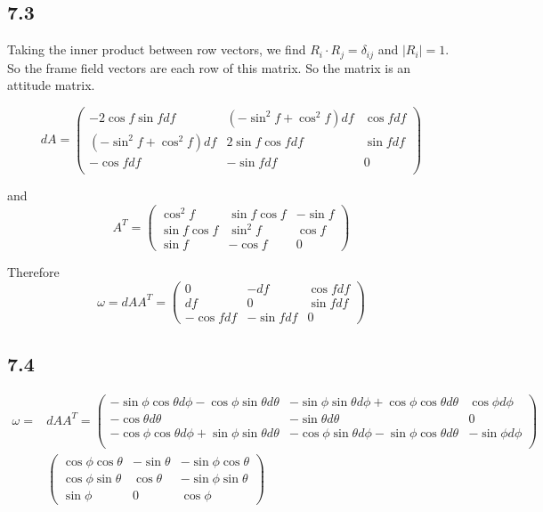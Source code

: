 \documentclass[12pt]{article}
\begin{document}
\subsection*{7.3}
Taking the inner product between row vectors, we find $R_i \cdot R_j = \delta_{ij}$ and $|R_i| = 1$. So the frame field vectors are each row of this matrix. So the matrix is an attitude matrix. 

$$ dA = \begin{pmatrix}
	-2\cos f \sin f df &  (-\sin^2 f + \cos^2 f ) df  & \cos f df \\
	 (-\sin^2 f + \cos^2 f ) df  & 2\sin f \cos f df & \sin f df \\
	 -\cos f df & -\sin f df & 0 \\
\end{pmatrix} $$

and $$
A^T = 
\begin{pmatrix}
	\cos^2f & \sin f \cos f & -\sin f \\
	\sin f \cos f & \sin^2f & \cos f \\
	\sin f & - \cos f & 0
\end{pmatrix}
$$

Therefore $$\omega = dA A^T = \begin{pmatrix}
	0  & -df & \cos f df  \\
	df & 0   &   \sin f df\\
	-\cos f df & -\sin f df & 0  
\end{pmatrix} $$

\subsection*{7.4}
$$\begin{aligned} \omega = &dA A^T = \begin{pmatrix}
	-\sin\phi \cos\theta d\phi -\cos\phi\sin\theta d\theta & -\sin\phi\sin\theta d\phi + \cos\phi\cos\theta d\theta & \cos\phi d\phi \\ 
	-\cos\theta d\theta & -\sin\theta d\theta & 0 \\
	-\cos\phi\cos\theta d\phi + \sin\phi\sin\theta d\theta & -\cos\phi\sin\theta d\phi - \sin\phi\cos\theta d\theta & -\sin\phi d\phi \\ 
\end{pmatrix} \\
&\begin{pmatrix}
	\cos\phi \cos \theta & -\sin \theta & -\sin \phi \cos \theta \\
	\cos\phi\sin\theta & \cos\theta &-\sin\phi \sin\theta \\
	\sin\phi & 0 & \cos\phi
\end{pmatrix} 
\end{aligned}
$$
\end{document}
